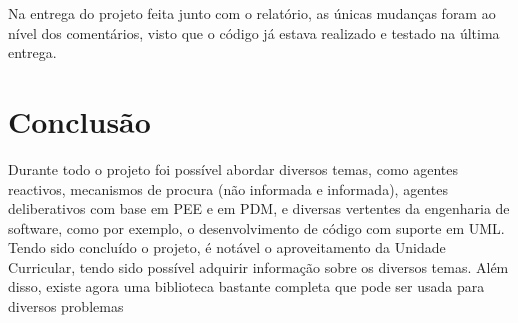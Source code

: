 \documentclass[a4paper,12pt]{article}
\begin{document}
Na entrega do projeto feita junto com o relatório, as únicas mudanças foram ao nível dos comentários, visto que o código já estava realizado e testado na última entrega.

\newpage
\section{Conclusão}

Durante todo o projeto foi possível abordar diversos temas, como agentes reactivos, mecanismos de procura (não informada e informada), agentes deliberativos com base em PEE e em PDM, e diversas vertentes da engenharia de software, como por exemplo, o desenvolvimento de código com suporte em UML.
Tendo sido concluído o projeto, é notável o aproveitamento da Unidade Curricular, tendo sido possível adquirir informação sobre os diversos temas. Além disso, existe agora uma biblioteca bastante completa que pode ser usada para diversos problemas

\newpage
\nocite{*}
\printbibliography[heading=bibintoc]
\end{document}
